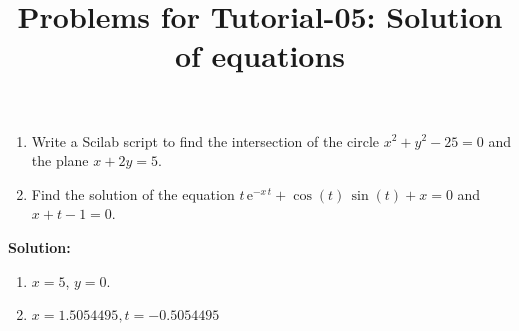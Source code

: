 \documentclass[10pt,a4paper]{article}
\begin{document}
\title{Problems for Tutorial-05: Solution of equations}
\date{}
\maketitle
\begin{enumerate}
\item Write a Scilab script to find the intersection of the circle 
$x^2 + y^2 - 25 = 0$ and the plane $x + 2y = 5$.
\item Find the solution of the equation $t \, \mathrm{e}^{-x \,t} + \cos(t) \, \sin(t) + x = 0$ and $x+t-1 = 0$.
\end{enumerate}
{\bf Solution:}
\begin{enumerate}
\item $x = 5$, $y = 0$.
\item $x = 1.5054495 , t = -0.5054495$
\end{enumerate}
\end{document}
